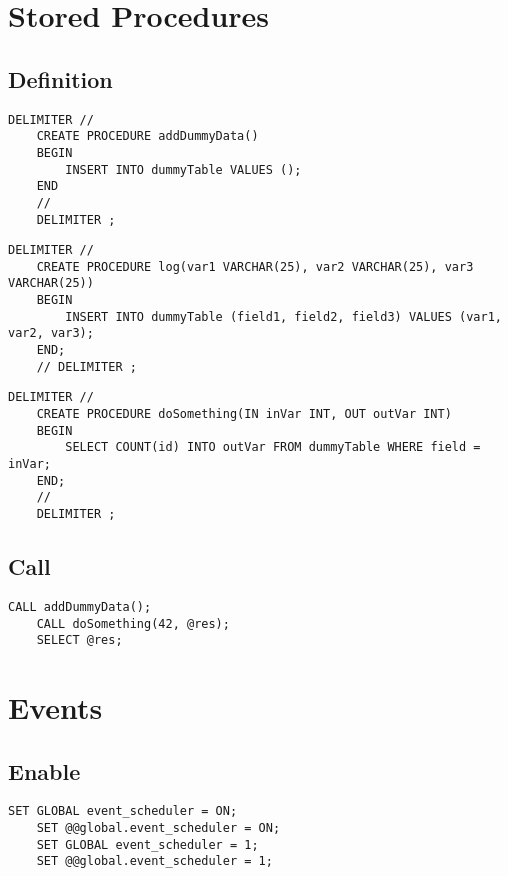 \documentclass[a4paper]{article}
\begin{document}
\section{Stored Procedures}

\subsection{Definition}

\begin{lstlisting}[style=sql]
    DELIMITER //
    CREATE PROCEDURE addDummyData()
    BEGIN
        INSERT INTO dummyTable VALUES ();
    END
    //
    DELIMITER ;
\end{lstlisting}

\begin{lstlisting}[style=sql]
    DELIMITER //
    CREATE PROCEDURE log(var1 VARCHAR(25), var2 VARCHAR(25), var3 VARCHAR(25))
    BEGIN
        INSERT INTO dummyTable (field1, field2, field3) VALUES (var1, var2, var3);
    END;
    // DELIMITER ;
\end{lstlisting}

\begin{lstlisting}[style=sql]
    DELIMITER //
    CREATE PROCEDURE doSomething(IN inVar INT, OUT outVar INT)
    BEGIN    
        SELECT COUNT(id) INTO outVar FROM dummyTable WHERE field = inVar;
    END;
    //
    DELIMITER ;
\end{lstlisting}

\subsection{Call}

\begin{lstlisting}[style=sql]
    CALL addDummyData();
    CALL doSomething(42, @res);
    SELECT @res;
\end{lstlisting}

\section{Events}

\subsection{Enable}

\begin{lstlisting}[style=sql]
    SET GLOBAL event_scheduler = ON;
    SET @@global.event_scheduler = ON;
    SET GLOBAL event_scheduler = 1;
    SET @@global.event_scheduler = 1;
\end{lstlisting}
\end{document}
